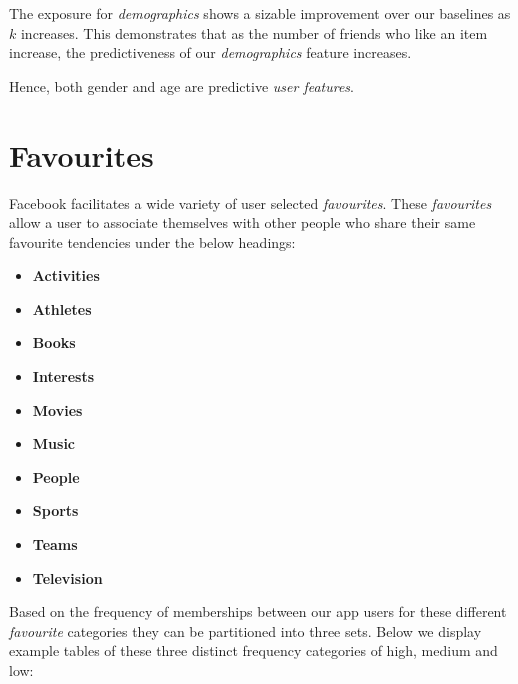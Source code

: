 The exposure for \emph{demographics} shows a sizable improvement over our baselines as $k$ increases. This demonstrates that as the
number of friends who like an item increase, the predictiveness of our \emph{demographics} feature increases. 

Hence, both gender and 
age are predictive \emph{user features}.

\section{Favourites}
\label{sec:traits}

Facebook facilitates a wide variety of user selected \emph{favourites}. 
These \emph{favourites} allow a user to associate themselves with other people who share their same favourite tendencies under the below headings:

\begin{itemize}
\item \textbf{Activities}
\item \textbf{Athletes}
\item \textbf{Books}
\item \textbf{Interests}
\item \textbf{Movies}
\item \textbf{Music}
\item \textbf{People}
\item \textbf{Sports}
\item \textbf{Teams}
\item \textbf{Television}
\end{itemize}

Based on the frequency of memberships between our app users for these different \emph{favourite} categories they can be partitioned into three sets.
Below we display example tables of these three distinct frequency categories of high, medium and low: 

